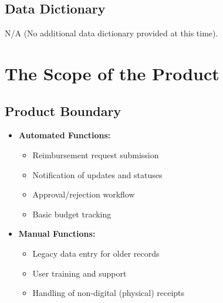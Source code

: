 \documentclass[12pt]{article}
\begin{document}
\subsection{Data Dictionary}
N/A (No additional data dictionary provided at this time).

\section{The Scope of the Product}
\subsection{Product Boundary}
\begin{itemize}
    \item \textbf{Automated Functions:}
    \begin{itemize}
        \item Reimbursement request submission
        \item Notification of updates and statuses
        \item Approval/rejection workflow
        \item Basic budget tracking
    \end{itemize}
    \item \textbf{Manual Functions:}
    \begin{itemize}
        \item Legacy data entry for older records
        \item User training and support
        \item Handling of non-digital (physical) receipts
    \end{itemize}
\end{itemize}
\end{document}

